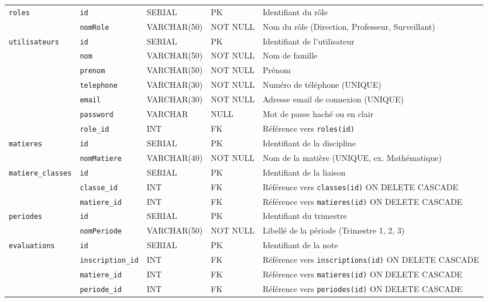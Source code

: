 \documentclass[11pt,a4paper,oneside]{report}
\begin{document}
\begin{table}[H]
\begin{tabularx}{\textwidth}{llllX}
        \midrule
        \texttt{roles} & \texttt{id} & SERIAL & PK & Identifiant du rôle \\
        & \texttt{nomRole} & VARCHAR(50) & NOT NULL & Nom du rôle (Direction, Professeur, Surveillant) \\
        \midrule
        \texttt{utilisateurs} & \texttt{id} & SERIAL & PK & Identifiant de l'utilisateur \\
        & \texttt{nom} & VARCHAR(50) & NOT NULL & Nom de famille \\
        & \texttt{prenom} & VARCHAR(50) & NOT NULL & Prénom \\
        & \texttt{telephone} & VARCHAR(30) & NOT NULL & Numéro de téléphone (UNIQUE) \\
        & \texttt{email} & VARCHAR(30) & NOT NULL & Adresse email de connexion (UNIQUE) \\
        & \texttt{password} & VARCHAR & NULL & Mot de passe haché ou en clair \\
        & \texttt{role\_id} & INT & FK & Référence vers \texttt{roles(id)} \\
        \midrule
        \texttt{matieres} & \texttt{id} & SERIAL & PK & Identifiant de la discipline \\
        & \texttt{nomMatiere} & VARCHAR(40) & NOT NULL & Nom de la matière (UNIQUE, ex. Mathématique) \\
        \midrule
        \texttt{matiere\_classes} & \texttt{id} & SERIAL & PK & Identifiant de la liaison \\
        & \texttt{classe\_id} & INT & FK & Référence vers \texttt{classes(id)} ON DELETE CASCADE \\
        & \texttt{matiere\_id} & INT & FK & Référence vers \texttt{matieres(id)} ON DELETE CASCADE \\
        \midrule
        \texttt{periodes} & \texttt{id} & SERIAL & PK & Identifiant du trimestre \\
        & \texttt{nomPeriode} & VARCHAR(50) & NOT NULL & Libellé de la période (Trimestre 1, 2, 3) \\
        \midrule
        \texttt{evaluations} & \texttt{id} & SERIAL & PK & Identifiant de la note \\
        & \texttt{inscription\_id} & INT & FK & Référence vers \texttt{inscriptions(id)} ON DELETE CASCADE \\
        & \texttt{matiere\_id} & INT & FK & Référence vers \texttt{matieres(id)} ON DELETE CASCADE \\
        & \texttt{periode\_id} & INT & FK & Référence vers \texttt{periodes(id)} ON DELETE CASCADE \\

\end{tabularx}
\end{table}
\end{document}
